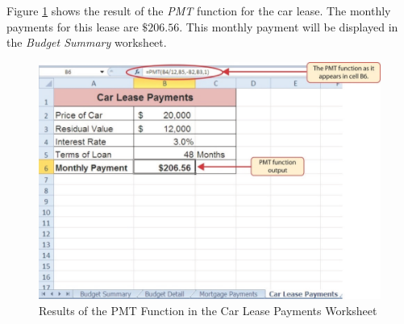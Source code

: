 Figure \ref{02:fig35} shows the result of the \textit{PMT} function for the car lease. The monthly payments for this lease are $ \$206.56 $. This monthly payment will be displayed in the \textit{Budget Summary} worksheet.

\begin{figure}[H]
	\centering
	\includegraphics[width=\maxwidth{.95\linewidth}]{gfx/ch02_fig35}
	\caption{Results of the PMT Function in the Car Lease Payments Worksheet}
	\label{02:fig35}
\end{figure}

